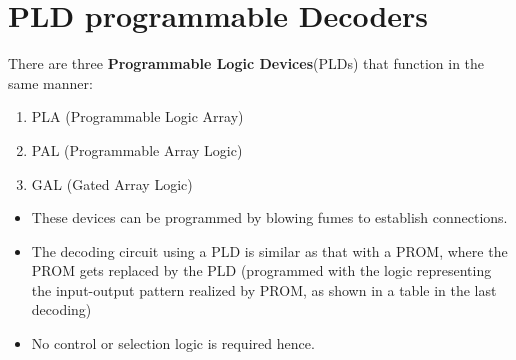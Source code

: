 \section{PLD programmable Decoders}
There are three \textbf{Programmable Logic Devices}(PLDs) that function in the same manner:
\begin{enumerate}
  \item PLA (Programmable Logic Array)
  \item PAL (Programmable Array Logic)
  \item GAL (Gated Array Logic)
\end{enumerate}
\begin{itemize}
  \item These devices can be programmed by blowing fumes to establish connections.
  \item The decoding circuit using a PLD is similar as that with a PROM, where the PROM gets replaced by the PLD (programmed with the logic representing the input-output pattern realized by PROM, as shown in a table in the last decoding)
  \item No control or selection logic is required hence.
\end{itemize}
